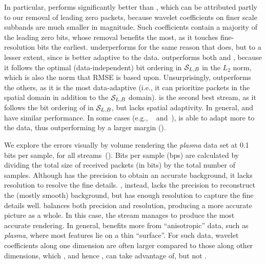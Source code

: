 In particular, \sbit performs significantly better than \slvl, which can be attributed partly to our
removal of leading zero packets, because wavelet coefficients on finer scale subbands are much
smaller in magnitude. Such coefficients contain a majority of the leading zero bits, whose removal
benefits \sbit the most, as it touches fine-resolution bits the earliest. \smag underperforms for
the same reason that \slvl does, but to a lesser extent, since \smag is better adaptive to the data.
\swav outperforms both \slvl and \sbit, because it follows the optimal (data-independent) bit
ordering in $\strm_{L,B}$ in the $L_2$ norm, which is also the norm that RMSE is based upon.
Unsurprisingly, \sopt outperforms the others, as it is the most data-adaptive (i.e., it can
prioritize packets in the spatial domain in addition to the $\strm_{L,B}$ domain). \ssig is the
second best stream, as it follows the bit ordering of \sopt in $\strm_{L,B}$, but lacks spatial
adaptivity. In general, \swav and \ssig have similar performance. In some cases (e.g.,
~ and~), \ssig is able to adapt more to the data,
thus outperforming \swav by a larger margin ().

We explore the errors visually by volume rendering the \emph{plasma} data set at 0.1 bits per
sample, for all streams~(). Bits per sample (bps) are calculated by
dividing the total size of received packets (in bits) by the total number of samples. Although \slvl
has the precision to obtain an accurate background, it lacks resolution to resolve the fine details.
\sbit, instead, lacks the precision to reconstruct the (mostly smooth) background, but has enough
resolution to capture the fine details well. \swav balances both precision and resolution, producing
a more accurate picture as a whole. In this case, the \ssig stream manages to produce the most
accurate rendering. In general, \ssig benefits more from ``anisotropic'' data, such as
\emph{plasma}, where most features lie on a thin ``surface''. For such data, wavelet coefficients
along one dimension are often larger compared to those along other dimensions, which \sopt, and
hence \ssig, can take advantage of, but not \swav.
